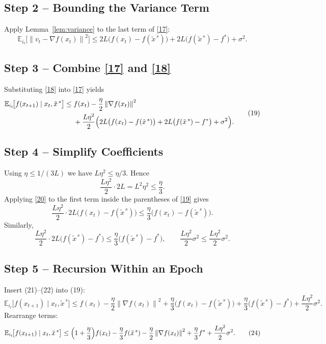\documentclass{article}
\newcommand{\EE}{\mathbb{E}}
\newcommand{\norm}[1]{\left\|#1\right\|}
\newcommand{\grad}{\nabla}
\begin{document}
\subsection*{Step 2 – Bounding the Variance Term}
Apply Lemma~\ref{lem:variance} to the last term of \eqref{17}:
\[
\EE_{i_t}\!\bigl[\norm{v_t-\grad f(x_t)}^{2}\bigr]
\le 2L\bigl(f(x_t)-f(\tilde{x}^{\,s})\bigr)
    +2L\bigl(f(\tilde{x}^{\,s})-f^{*}\bigr)
    +\sigma^{2}.
\tag{18}
\]

\subsection*{Step 3 – Combine \eqref{17} and \eqref{18}}
Substituting \eqref{18} into \eqref{17} yields
\[
\begin{aligned}
\EE_{i_t}\!\bigl[f(x_{t+1})\mid x_t,\tilde{x}^{\,s}\bigr]
\le\;& f(x_t)-\frac{\eta}{2}\norm{\grad f(x_t)}^{2}\\
&+\frac{L\eta^{2}}{2}\Bigl(2L\bigl(f(x_t)-f(\tilde{x}^{\,s})\bigr)
    +2L\bigl(f(\tilde{x}^{\,s})-f^{*}\bigr)+\sigma^{2}\Bigr).
\end{aligned}
\tag{19}
\]

\subsection*{Step 4 – Simplify Coefficients}
Using $\eta\le 1/(3L)$ we have $L\eta^{2}\le \eta/3$. Hence
\[
\frac{L\eta^{2}}{2}\cdot 2L = L^{2}\eta^{2}\le \frac{\eta}{3}.
\tag{20}
\]
Applying \eqref{20} to the first term inside the parentheses of \eqref{19} gives
\[
\frac{L\eta^{2}}{2}\cdot 2L\bigl(f(x_t)-f(\tilde{x}^{\,s})\bigr)
\le \frac{\eta}{3}\bigl(f(x_t)-f(\tilde{x}^{\,s})\bigr).
\tag{21}
\]
Similarly,
\[
\frac{L\eta^{2}}{2}\cdot 2L\bigl(f(\tilde{x}^{\,s})-f^{*}\bigr)
\le \frac{\eta}{3}\bigl(f(\tilde{x}^{\,s})-f^{*}\bigr),
\qquad
\frac{L\eta^{2}}{2}\sigma^{2}\le \frac{L\eta^{2}}{2}\sigma^{2}.
\tag{22}
\]

\subsection*{Step 5 – Recursion Within an Epoch}
Insert (21)–(22) into (19):
\[
\EE_{i_t}\!\bigl[f(x_{t+1})\mid x_t,\tilde{x}^{\,s}\bigr]
\le f(x_t)-\frac{\eta}{2}\norm{\grad f(x_t)}^{2}
   +\frac{\eta}{3}\bigl(f(x_t)-f(\tilde{x}^{\,s})\bigr)
   +\frac{\eta}{3}\bigl(f(\tilde{x}^{\,s})-f^{*}\bigr)
   +\frac{L\eta^{2}}{2}\sigma^{2}.
\tag{23}
\]
Rearrange terms:
\[
\EE_{i_t}\!\bigl[f(x_{t+1})\mid x_t,\tilde{x}^{\,s}\bigr]
\le \Bigl(1+\frac{\eta}{3}\Bigr)f(x_t)
     -\frac{\eta}{3}f(\tilde{x}^{\,s})
     -\frac{\eta}{2}\norm{\grad f(x_t)}^{2}
     +\frac{\eta}{3}f^{*}
     +\frac{L\eta^{2}}{2}\sigma^{2}.
\tag{24}
\]
\end{document}
